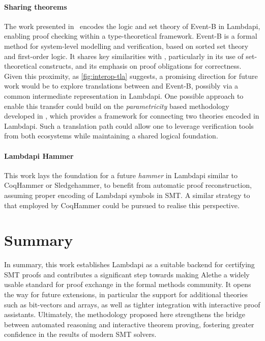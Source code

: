 \paragraph{Sharing \tlaplus theorems}
The work presented in~\cite{eventb2lp} encodes the logic and set theory of Event-B in Lambdapi, enabling proof checking within a type-theoretical framework.
Event-B is a formal method for system-level modelling and verification, based on sorted set theory and first-order logic.
It shares key similarities with \tlaplus, particularly in its use of set-theoretical constructs, and its emphasis on proof obligations for correctness.
Given this proximity, as \cref{fig:interop-tla} suggests, a promising direction for future work would be to explore translations between \tlaplus and Event-B, possibly via a common intermediate representation in Lambdapi.
One possible approach to enable this transfer could build on the \emph{parametricity} \cite{theorem-for-free,parametricity} based methodology developed in \cite{parametricity-lp}, which provides a framework for connecting two theories encoded in Lambdapi. 
Such a translation path could allow one to leverage verification tools from both ecosystems while maintaining a shared logical foundation.

\paragraph{Lambdapi Hammer} This work lays the foundation for a future \emph{hammer} in Lambdapi similar to CoqHammer or Sledgehammer, to benefit from automatic proof reconstruction, assuming proper encoding of Lambdapi symbols in SMT.
A similar strategy to that employed by CoqHammer \cite{coqhammer1,coqhammer2}  could be pursued to realise this perspective.

\section{Summary}

In summary, this work establishes Lambdapi as a suitable backend for certifying SMT proofs and contributes a significant step towards making Alethe a widely usable standard for proof exchange in the formal methods community.
It opens the way for future extensions, in particular the support for additional theories such as bit-vectors and arrays, as well as tighter integration with interactive proof assistants.
Ultimately, the methodology proposed here strengthens the bridge between automated reasoning and interactive theorem proving, fostering greater confidence in the results of modern SMT solvers.
